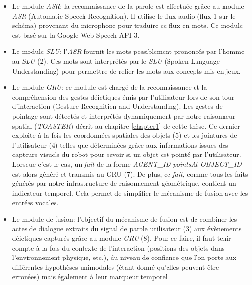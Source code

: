 \documentclass[a4paper,11pt,twoside]{StyleThese}
\begin{document}
\begin{itemize}
\item Le module \textit{ASR}: la reconnaissance de la parole est effectuée grâce au module \textit{ASR} (Automatic Speech Recognition). Il utilise le flux audio (flux 1 sur le schéma) provenant du microphone pour traduire ce flux en mots. Ce module est basé sur la Google Web Speech API 3.
\item Le module \textit{SLU}: l'\textit{ASR} fournit les mots possiblement prononcés par l'homme au \textit{SLU} (2). Ces mots sont interprétés par le \textit{SLU} (Spoken Language Understanding) pour permettre de relier les mots aux concepts mis en jeux.
\item Le module \textit{GRU}: ce module est chargé de la reconnaissance et la compréhension des gestes déictiques émis par l’utilisateur lors de son tour d’interaction (Gesture Recognition and Understanding). Les gestes de pointage sont détectés et interprétés dynamiquement par notre raisonneur spatial (\textit{TOASTER}) décrit au chapitre \ref{chapter1} de cette thèse. Ce dernier exploite à la fois les coordonnées spatiales des objets (5) et les jointures de l’utilisateur (4) telles que déterminées grâce aux informations issues des capteurs visuels du robot pour savoir si un objet est pointé par l’utilisateur. Lorsque c’est le cas, un \textit{fait} de la forme \textit{AGENT\_ID pointsAt
OBJECT\_ID} est alors généré et transmis au GRU (7). De plus, ce \textit{fait}, comme tous les faits générés par notre infrastructure de raisonnement géométrique, contient un indicateur temporel. Cela permet de simplifier le mécanisme de
fusion avec les entrées vocales.
\item Le module de fusion: l’objectif du mécanisme de fusion est de combiner les actes de dialogue extraits du
signal de parole utilisateur (3) aux évènements déictiques capturés grâce au module \textit{GRU} (8).
Pour ce faire, il faut tenir compte à la fois du contexte de l’interaction (positions des objets dans l’environnement physique, etc.), du niveau de confiance que l’on porte aux différentes hypothèses unimodales (étant donné qu’elles peuvent être erronées) mais également à leur marqueur temporel.

\end{itemize}
\end{document}

